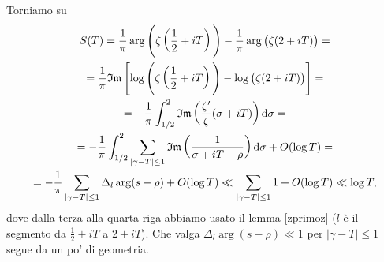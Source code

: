 Torniamo su
\begin{gather*}
  S(T)=\frac{1}{\pi}\arg\Bigg(\zeta\left(\frac{1}{2}+iT\right)\Bigg)-\frac{1}{\pi}\arg\big(\zeta(2+iT)\big)= \\
  =\frac{1}{\pi}\mathfrak{Im}\left[\log\Bigg(\zeta\left(\frac{1}{2}+iT\right)\Bigg)-\log\big(\zeta(2+iT)\big)\right]= \\
  =-\frac{1}{\pi}\int_{1/2}^2 \mathfrak{Im}\left(\frac{\zeta'}{\zeta}(\sigma+iT)\right)\mathop{}\!\mathrm{d}\sigma= \\
  =-\frac{1}{\pi}\int_{1/2}^2 \sum_{|\gamma-T| \le 1} \mathfrak{Im}\left(\frac{1}{\sigma+iT-\rho}\right)\mathop{}\!\mathrm{d}\sigma+O(\log{T})= \\
  =-\frac{1}{\pi}\sum_{|\gamma-T| \le 1} \Delta_l\arg(s-\rho) +O(\log{T}) \ll \sum_{|\gamma-T| \le 1} 1 +O(\log{T}) \ll \log{T},
\end{gather*}
dove dalla terza alla quarta riga abbiamo usato il lemma \ref{zprimoz} ($l$ è il segmento da $\frac{1}{2}+iT$ a $2+iT$). Che valga $\Delta_l\arg(s-\rho) \ll 1$ per $|\gamma-T| \le 1$ segue da un po' di geometria.
